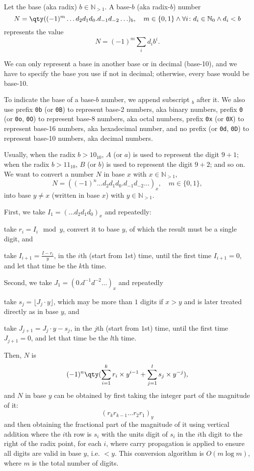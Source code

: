 \documentclass[a4paper,12pt]{report}
\begin{document}
\begin{itemizle}
Let the base (aka radix) $b\in\mathbb{N}_{>1}$. A base-$b$ (aka radix-$b$) number
\[N=\qty((-1)^m\ldots d_2d_1d_0.d_{-1}d_{-2}\ldots)_b,\quad m\in\{0,1\}\land\forall i\colon d_i\in\mathbb{N}_0\land d_i<b\]
represents the value
\[N =(-1)^m\sum_id_ib^i.\]

We can only represent a base in another base or in decimal (base-10), and we have to specify the base you use if not in decimal; otherwise, every base would be base-10.

To indicate the base of a base-$b$ number, we append subscript $_b$ after it. We also use prefix \verb|0b| (or \verb|0B|) to represent base-2 numbers, aka binary numbers, prefix \verb|0| (or \verb|0o|, \verb|0O|) to represent base-8 numbers, aka octal numbers, prefix \verb|0x| (or \verb|0X|) to represent base-16 numbers, aka hexadecimal number, and no prefix (or \verb|0d|, \verb|0D|) to represent base-10 numbers, aka decimal numbers.

Usually, when the radix $b>10_{10}$, $A$ (or $a$) is used to represent the digit $9+1$; when the radix $b>11_{10}$, $B$ (or $b$) is used to represent the digit $9+2$; and so on.
We want to convert a number $N$ in base $x$ with $x\in\mathbb{N}_{>1}$,
\[N=((-1)^n\ldots d_2d_1d_0.d_{-1}d_{-2}\ldots)_x,\quad m\in\{0,1\},\]
into base $y\neq x$ (written in base $x$) with $y\in\mathbb{N}_{>1}$.
\ben
\item First, we take $I_1=(\ldots d_2d_1d_0)_x$ and repeatedly:
\ben
\item take $r_i=I_i\mod y$, convert it to base $y$, of which the result must be a single digit, and
\item take $I_{i+1}=\frac{I-r_i}{y}$,
\een
in the $i$th (start from $1$st) time, until the first time $I_{i+1}=0$, and let that time be the $k$th time.
\item Second, we take $J_1=(0.d^{-1}d^{-2}\ldots)_x$ and repeatedly
\ben
\item take $s_j=\lfloor J_j\cdot y\rfloor$, which may be more than $1$ digits if $x>y$ and is later treated directly as in base $y$, and
\item take $J_{j+1}=J_j\cdot y-s_j$,
\een
in the $j$th (start from $1$st) time, until the first time $J_{j+1}=0$, and let that time be the $l$th time.
\item Then, $N$ is
\[(-1)^n\qty(\sum_{i=1}^kr_i\times y^{i-1}+\sum_{j=1}^ls_j\times y^{-j}),\]
and $N$ in base $y$ can be obtained by first taking the integer part of the magnitude of it:
\[(r_kr_{k-1}\ldots r_2r_1)_y\]
and then obtaining the fractional part of the magnitude of it using vertical addition where the $i$th row is $s_i$ with the units digit of $s_i$ in the $i$th digit to the right of the radix point, for each $i$, where carry propagation is applied to ensure all digits are valid in base $y$, i.e. $<y$.
\een
This conversion algorithm is $O(m\log m)$, where $m$ is the total number of digits.


\end{itemizle}
\end{document}
